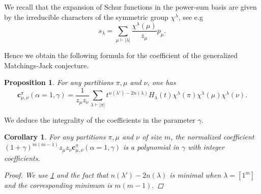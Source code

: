 \documentclass[12pt]{amsart}
\newtheorem{cor}[thm]{Corollary}
\newtheorem{prop}[thm]{Proposition}
\theoremstyle{remark}
\newcommand{\bfc}{\boldsymbol{c}}
\begin{document}
We recall that the expansion of Schur functions in the power-sum basis are given by the irreducible characters of the symmetric group $\chi^\lambda$, see e.g \cite[Chapter I]{Macdonald1995}
$$s_\lambda=\sum_{\mu\vdash |\lambda|}\frac{\chi^\lambda(\mu)}{z_\mu}p_\mu.$$

Hence we obtain the following formula for the coefficient of the generalized Matchings-Jack conjecture.
\begin{prop}\label{prop c alpha=1}
    For any partitions $\pi,\mu$ and $\nu$, one has
    $$\bfc^\pi_{\mu,\nu}(\alpha=1,\gamma)=\frac{1}{z_\mu z_\nu} \sum_{\lambda\vdash |\pi|} t^{n(\lambda')-2n(\lambda)}H_\lambda(t)\chi^\lambda(\pi)\chi^\lambda(\mu)\chi^\lambda(\nu).$$
\end{prop}

We deduce the integrality of the coefficients in the parameter $\gamma$.
\begin{cor}
 For any partitions $\pi,\mu$ and $\nu$ of size $m$, the normalized coefficient \\
    $(1+\gamma)^{m(m-1)}z_\mu z_\nu \bfc^\pi_{\mu,\nu}(\alpha=1,\gamma)$ is a polynomial in $\gamma$ with integer coefficients.
    \begin{proof}
        We use \cref{prop c alpha=1} and the fact that $n(\lambda')-2n(\lambda)$ is minimal when $\lambda=[1^m]$ and the corresponding minimum is $m(m-1).$
    \end{proof}
\end{cor}



   
\end{document}
